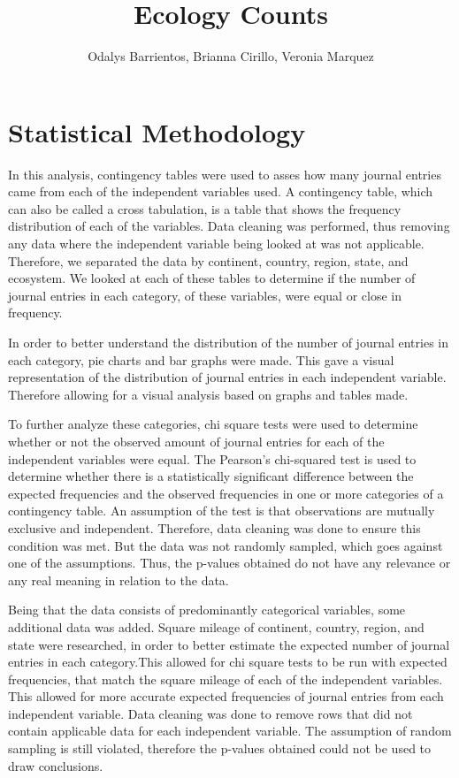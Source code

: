 \documentclass[
]{article}
\title{Ecology Counts}
\author{Odalys Barrientos, Brianna Cirillo, Veronia Marquez}
\date{}
\begin{document}
\maketitle

\hypertarget{statistical-methodology}{%
\section{Statistical Methodology}\label{statistical-methodology}}

In this analysis, contingency tables were used to asses how many journal
entries came from each of the independent variables used. A contingency
table, which can also be called a cross tabulation, is a table that
shows the frequency distribution of each of the variables. Data cleaning
was performed, thus removing any data where the independent variable
being looked at was not applicable. Therefore, we separated the data by
continent, country, region, state, and ecosystem. We looked at each of
these tables to determine if the number of journal entries in each
category, of these variables, were equal or close in frequency.

In order to better understand the distribution of the number of journal
entries in each category, pie charts and bar graphs were made. This gave
a visual representation of the distribution of journal entries in each
independent variable. Therefore allowing for a visual analysis based on
graphs and tables made.

To further analyze these categories, chi square tests were used to
determine whether or not the observed amount of journal entries for each
of the independent variables were equal. The Pearson's chi-squared test
is used to determine whether there is a statistically significant
difference between the expected frequencies and the observed frequencies
in one or more categories of a contingency table. An assumption of the
test is that observations are mutually exclusive and independent.
Therefore, data cleaning was done to ensure this condition was met. But
the data was not randomly sampled, which goes against one of the
assumptions. Thus, the p-values obtained do not have any relevance or
any real meaning in relation to the data.

Being that the data consists of predominantly categorical variables,
some additional data was added. Square mileage of continent, country,
region, and state were researched, in order to better estimate the
expected number of journal entries in each category.This allowed for chi
square tests to be run with expected frequencies, that match the square
mileage of each of the independent variables. This allowed for more
accurate expected frequencies of journal entries from each independent
variable. Data cleaning was done to remove rows that did not contain
applicable data for each independent variable. The assumption of random
sampling is still violated, therefore the p-values obtained could not be
used to draw conclusions.
\end{document}
